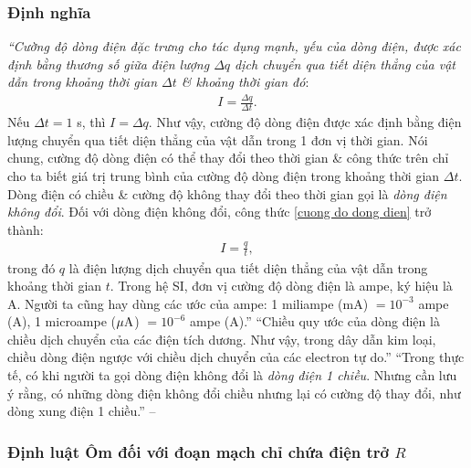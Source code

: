\documentclass[oneside]{book}
\numberwithin{equation}{section}
\begin{document}
\subsubsection{Định nghĩa}
\textit{``Cường độ dòng điện đặc trưng cho tác dụng mạnh, yếu của dòng điện, được xác định bằng thương số giữa điện lượng $\Delta q$ dịch chuyển qua tiết diện thẳng của vật dẫn trong khoảng thời gian $\Delta t$ \& khoảng thời gian đó}:
\begin{align}
	\label{cuong do dong dien}
	I = \frac{\Delta q}{\Delta t}.
\end{align}
Nếu $\Delta t = 1$ s, thì $I = \Delta q$. Như vậy, cường độ dòng điện được xác định bằng điện lượng chuyển qua tiết diện thẳng của vật dẫn trong 1 đơn vị thời gian. Nói chung, cường độ dòng điện có thể thay đổi theo thời gian \& công thức trên chỉ cho ta biết giá trị trung bình của cường độ dòng điện trong khoảng thời gian $\Delta t$. Dòng điện có chiều \& cường độ không thay đổi theo thời gian gọi là \textit{dòng điện không đổi}. Đối với dòng điện không đổi, công thức \eqref{cuong do dong dien} trở thành:
\begin{align}
	\label{cuong do dong dien khong doi}
	I = \frac{q}{t},
\end{align}
trong đó $q$ là điện lượng dịch chuyển qua tiết diện thẳng của vật dẫn trong khoảng thời gian $t$. Trong hệ SI, đơn vị cường độ dòng điện là ampe, ký hiệu là A. Người ta cũng hay dùng các ước của ampe: 1 miliampe (mA) $= 10^{-3}$ ampe (A), 1 microampe ($\mu{\rm A}$) $= 10^{-6}$ ampe (A).'' ``Chiều quy ước của dòng điện là chiều dịch chuyển của các điện tích dương. Như vậy, trong dây dẫn kim loại, chiều dòng điện ngược với chiều dịch chuyển của các electron tự do.'' ``Trong thực tế, có khi người ta gọi dòng điện không đổi là \textit{dòng điện 1 chiều}. Nhưng cần lưu ý rằng, có những dòng điện không đổi chiều nhưng lại có cường độ thay đổi, như dòng xung điện 1 chiều.'' -- \cite[pp. 48--49]{SGK_Vat_Ly_11_nang_cao}

\subsubsection{Định luật Ôm đối với đoạn mạch chỉ chứa điện trở $R$}
\end{document}

